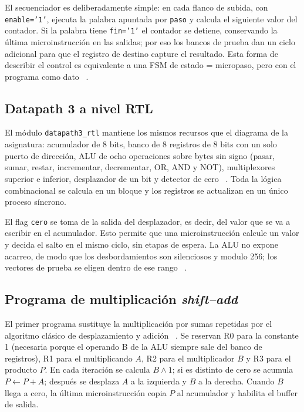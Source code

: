 \documentclass[llncs]{llncs}
\begin{document}
El secuenciador es deliberadamente simple: en cada flanco de subida, con
\texttt{enable='1'}, ejecuta la palabra apuntada por \texttt{paso} y calcula el
siguiente valor del contador. Si la palabra tiene \texttt{fin='1'} el
contador se detiene, conservando la última microinstrucción en las salidas; por
eso los bancos de prueba dan un ciclo adicional para que el registro de
destino capture el resultado. Esta forma de describir el control es equivalente
a una FSM de estado = micropaso, pero con el programa como dato
~\cite{wakerly2017,mano2002}.

\subsection{Datapath 3 a nivel RTL}

El módulo \texttt{datapath3\_rtl} mantiene los mismos recursos que el
diagrama de la asignatura: acumulador de 8 bits, banco de 8 registros de 8
bits con un solo puerto de dirección, ALU de ocho operaciones sobre bytes sin
signo (pasar, sumar, restar, incrementar, decrementar, OR, AND y NOT),
multiplexores superior e inferior, desplazador de un bit y detector de cero
~\cite{patterson2014,manokime2000}. Toda la lógica combinacional se calcula en
un bloque y los registros se actualizan en un único proceso síncrono.

El flag \texttt{cero} se toma de la salida del desplazador, es decir, del valor
que se va a escribir en el acumulador. Esto permite que una microinstrucción
calcule un valor y decida el salto en el mismo ciclo, sin etapas de espera.
La ALU no expone acarreo, de modo que los desbordamientos son silenciosos y
modulo 256; los vectores de prueba se eligen dentro de ese rango
~\cite{hennessy2012}.

\subsection{Programa de multiplicación \emph{shift--add}}

El primer programa sustituye la multiplicación por sumas repetidas por el
algoritmo clásico de desplazamiento y adición
~\cite{patterson2017,brown2009}. Se reservan R0 para la constante 1 (necesaria
porque el operando B de la ALU siempre sale del banco de registros), R1 para el
multiplicando $A$, R2 para el multiplicador $B$ y R3 para el producto $P$. En
cada iteración se calcula $B \wedge 1$; si es distinto de cero se acumula
$P \leftarrow P + A$; después se desplaza $A$ a la izquierda y $B$ a la
derecha. Cuando $B$ llega a cero, la última microinstrucción copia $P$ al
acumulador y habilita el buffer de salida.
\end{document}
